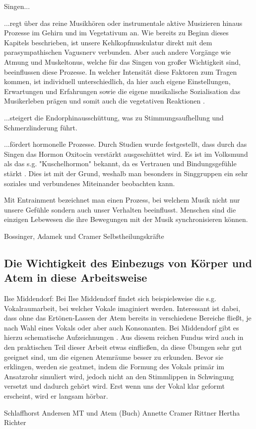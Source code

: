 Singen...

...regt über das reine Musikhören oder instrumentale aktive Musizieren hinaus Prozesse im Gehirn und im Vegetativum an. Wie bereits zu Beginn dieses Kapitels beschrieben, ist unsere Kehlkopfmuskulatur direkt mit dem parasympathischen Vagusnerv verbunden. Aber auch andere Vorgänge wie Atmung und Muskeltonus, welche für das Singen von großer Wichtigkeit sind, beeinflussen diese Prozesse. In welcher Intensität diese Faktoren zum Tragen kommen, ist individuell unterschiedlich, da hier auch eigene Einstellungen, Erwartungen und Erfahrungen sowie die eigene musikalische Sozialisation das Musikerleben prägen und somit auch die vegetativen Reaktionen \autocite[vgl.][121]{bossinger2006}. 

...steigert die Endorphinausschüttung, was zu Stimmungsaufhellung und Schmerzlinderung führt.

...fördert hormonelle Prozesse. Durch Studien wurde festgestellt, dass durch das Singen das Hormon Oxitocin verstärkt ausgeschüttet wird. Es ist im Volksmund als das s.g. "Kuschelhormon" bekannt, da es Vertrauen und Bindungsgefühle stärkt \autocite[vgl.]{film}. Dies ist mit der Grund, weshalb man besonders in Singgruppen ein sehr soziales und verbundenes Miteinander beobachten kann.

Mit Entrainment bezeichnet man einen Prozess, bei welchem Musik nicht nur unsere Gefühle sondern auch unser Verhalten beeinflusst. Menschen sind die einzigen Lebewesen die ihre Bewegungen mit der Musik synchronisieren können.

Bossinger, Adamek und Cramer
Selbstheilungskräfte


\subsection{Die Wichtigkeit des Einbezugs von Körper und Atem in diese Arbeitsweise}
Ilse Middendorf: Bei Ilse Middendorf findet sich beispielsweise die s.g. Vokalraumarbeit, bei welcher Vokale imaginiert werden. Interessant ist dabei, dass ohne das Ertönen-Lassen der Atem bereits in verschiedene Bereiche fließt, je nach Wahl eines Vokals oder aber auch Konsonanten. Bei Middendorf gibt es hierzu schematische Aufzeichnungen \autocite[vgl.][60ff.]{middendorf1995}. Aus diesem reichen Fundus wird auch in den praktischen Teil dieser Arbeit etwas einfließen, da diese Übungen sehr gut geeignet sind, um die eigenen Atemräume besser zu erkunden. Bevor sie erklingen, werden sie geatmet, indem die Formung des Vokals primär im Ansatzrohr simuliert wird, jedoch nicht an den Stimmlippen in Schwingung versetzt und dadurch gehört wird. Erst wenn uns der Vokal klar geformt erscheint, wird er langsam hörbar. 

Schlaffhorst Andersen
MT und Atem (Buch)
Annette Cramer
Rittner
Hertha Richter







\newpage\thispagestyle{empty}
